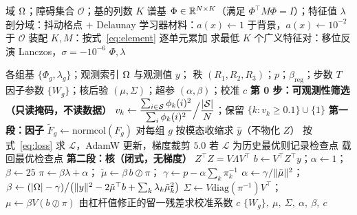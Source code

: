 \documentclass[11pt,a4paper]{article}
\begin{document}
\begin{algorithm}[htbp]
\caption{构造几何字典（离线，一次性，不接触数据）}
\label{alg:dict}
\begin{algorithmic}[1]
\Require 域 $\Omega$；障碍集合 $\mathcal O$；基的列数 $K$
\Ensure 谱基 $\Phi\in\mathbb{R}^{N\times K}$（满足 $\Phi^\top M\Phi=I$）；特征值 $\lambda$
\State 剖分域：抖动格点 $+$ Delaunay 
\State 学习器材料：$a(x)\!\leftarrow\!1$ 于背景，$a(x)\!\leftarrow\!10^{-2}$ 于 $\mathcal O$
\State 装配 $K,M$：按式~\eqref{eq:element} 逐单元累加
\State 求最低 $K$ 个广义特征对：移位反演 Lanczos，$\sigma=-10^{-6}$
\State \Return $\Phi,\lambda$
\end{algorithmic}
\end{algorithm}

\begin{algorithm}[htbp]
\caption{两段式拟合}
\label{alg:fit}
\begin{algorithmic}[1]
\Require 各组基 $\{\Phi_g,\lambda_g\}$；观测索引 $\Omega$ 与观测值 $y$；
         秩 $(R_1,R_2,R_3)$；$p$；$\beta_{\mathrm{reg}}$；步数 $T$
\Ensure 因子参数 $\{W_g\}$；核后验 $(\mu,\Sigma)$；超参 $(\alpha,\beta)$；校准 $c$
\Statex \textbf{第 0 步：可观测性筛选（只读掩码，不读数据）}
\State $v_k\leftarrow\dfrac{\sum_{i\in\mathcal{S}}\phi_k(i)^2}{\sum_i\phi_k(i)^2}
        \Big/\dfrac{|\mathcal{S}|}{N}$；保留 $\{k:v_k\ge0.1\}\cup\{1\}$
\Statex \textbf{第一段：因子}
  \State $\tilde F_g\leftarrow\mathrm{normcol}(F_g)$ 对每组 $g$
  \State 按模态收缩求 $\hat y$（不物化 $Z$）
  \State 按式~\eqref{eq:loss} 求 $\mathcal L$，AdamW 更新，梯度裁剪 $5.0$
  \State 若 $\mathcal L$ 为历史最优则记录检查点
\EndFor
\State 载回最优检查点 
\Statex \textbf{第二段：核（闭式，无梯度）}
\State $Z^\top Z=V\Lambda V^\top$ 
\State $b\leftarrow V^\top Z^\top y$；$\alpha\leftarrow1$；$\beta\leftarrow25$
  \State $\pi\leftarrow\beta\lambda+\alpha$；\;
         $\tilde\mu\leftarrow\beta\,b\oslash\pi$；\;
         $\gamma\leftarrow p-\alpha\sum_k\pi_k^{-1}$
  \State $\alpha\leftarrow\gamma/\lVert \tilde\mu \rVert^2$；\;
         $\beta\leftarrow(|\Omega|-\gamma)\big/
         \big(\lVert y \rVert^2-2\tilde\mu^\top b+\sum_k\lambda_k\tilde\mu_k^2\big)$
\EndFor
\State $\Sigma\leftarrow V\mathrm{diag}(\pi^{-1})V^\top$；\;
       $\mu\leftarrow\beta V(b\oslash\pi)$
\State 由杠杆值修正的留一残差求校准系数 $c$
\State \Return $\{W_g\},\ \mu,\ \Sigma,\ \alpha,\ \beta,\ c$
\end{algorithmic}
\end{algorithm}
\end{document}
